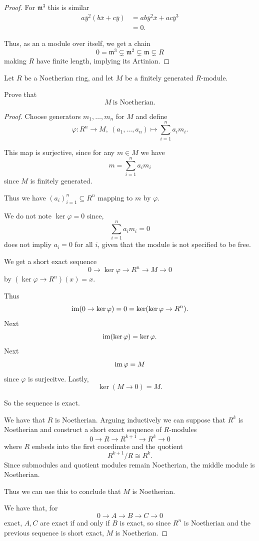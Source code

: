\documentclass[11pt]{article}
\begin{document}
\begin{proof}
    For $\mathfrak m^3$ this is similar 
    \begin{align*}
        a\overline y^2(b\overline x + c \overline y) 
        &= ab\overline y^2\overline x + ac\overline y^3 \\ 
        &= 0. 
    \end{align*}

    Thus, as an a module over itself, 
    we get a chain 
    \[
        0 = \mathfrak m^3 \subsetneq \mathfrak m^2 
        \subsetneq \mathfrak m \subsetneq R 
    \]
    making $R$ have finite length, implying its 
    Artinian.
\end{proof}

\begin{prob}
    Let $R$ be a Noetherian ring, and let $M$ be a 
    finitely generated $R$-module. 

    Prove that 
    \[
        M \ \text{is Noetherian}. 
    \]

\end{prob}
\begin{proof}
    Choose generators $m_1,\ldots,m_n$ for 
    $M$ and define 
    \[
        \varphi : R^n \to M, \ (a_1,\ldots,a_n) 
        \mapsto \sum_{i=1}^n a_im_i.
    \]

    This map is surjective, since 
    for any $m \in M$ we have 
    \[
        m = \sum_{i=1}^n a_im_i 
    \]  
    since $M$ is finitely generated. 

    Thus we have $(a_i)_{i=1}^n \subseteq R^n$ 
    mapping to $m$ by $\varphi$. 

    We do not note $\ker \varphi = 0$ since,  
    \[
        \sum_{i=1}^n a_im_i = 0 
    \]
    does not impliy $a_i = 0$ for all $i$, given 
    that the module is not specified to be free. 

    We get a short exact sequence 
    \[
        0 \to \ker \varphi 
        \to R^n \to M \to 0 
    \]
    by $(\ker \varphi \to R^n)(x) = x$. 

    Thus 
    \[
        \operatorname{im}(0\to \ker \varphi) = 0 = 
        \ker (\ker \varphi \to R^n). 
    \]    
    Next 
    \[
        \operatorname{im}(\ker \varphi) = \ker \varphi.  
    \]
    Next 
    \[
        \operatorname{im} \varphi = M 
    \]
    since $\varphi$ is surjecitve. Lastly, 
    \[
        \ker(M \to 0) = M. 
    \]

    So the sequence is exact. 

    We have that $R$ is Noetherian. 
    Arguing inductively we can suppose that 
    $R^k$ is Noetherian and construct a short 
    exact sequence of $R$-modules 
    \[
        0 \to R \to R^{k+1} \to R^k \to 0 
    \]
    where $R$ embeds into the first coordinate 
    and the quotient 
    \[
        R^{k+1}/R \cong R^k. 
    \]
    Since submodules and quotient modules 
    remain Noetherian, the middle module is 
    Noetherian. 

    Thus we can use this to conclude that $M$ 
    is Noetherian. 

    We have that, for  
    \[
        0 \to A \to B \to C \to 0 
    \]
    exact, $A,C$ are exact if and only if 
    $B$ is exact, so since $R^n$ is Noetherian 
    and the previous sequence is short exact, 
    $M$ is Noetherian. 
\end{proof}
\end{document}
